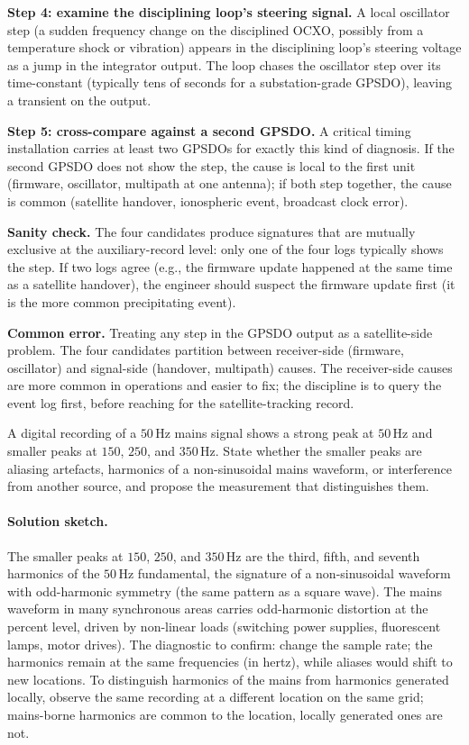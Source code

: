 \begin{exercise}
\textbf{Step 4: examine the disciplining loop's steering signal.}
A local oscillator step (a sudden frequency change on the
disciplined OCXO, possibly from a temperature shock or
vibration) appears in the disciplining loop's steering voltage
as a jump in the integrator output. The loop chases the
oscillator step over its time-constant (typically tens of
seconds for a substation-grade GPSDO), leaving a transient on
the output.

\textbf{Step 5: cross-compare against a second GPSDO.} A critical
timing installation carries at least two GPSDOs for exactly this
kind of diagnosis. If the second GPSDO does not show the step,
the cause is local to the first unit (firmware, oscillator,
multipath at one antenna); if both step together, the cause is
common (satellite handover, ionospheric event, broadcast clock
error).

\textbf{Sanity check.} The four candidates produce signatures
that are mutually exclusive at the auxiliary-record level: only
one of the four logs typically shows the step. If two logs
agree (e.g., the firmware update happened at the same time as a
satellite handover), the engineer should suspect the firmware
update first (it is the more common precipitating event).

\textbf{Common error.} Treating any step in the GPSDO output as
a satellite-side problem. The four candidates partition between
receiver-side (firmware, oscillator) and signal-side (handover,
multipath) causes. The receiver-side causes are more common in
operations and easier to fix; the discipline is to query the
event log first, before reaching for the satellite-tracking
record.
\end{exercise}

\begin{exercise}
A digital recording of a $50 \,\si{\hertz}$ mains signal shows a
strong peak at $50 \,\si{\hertz}$ and smaller peaks at $150$,
$250$, and $350 \,\si{\hertz}$. State whether the smaller peaks
are aliasing artefacts, harmonics of a non-sinusoidal mains
waveform, or interference from another source, and propose the
measurement that distinguishes them.

\paragraph{Solution sketch.}
The smaller peaks at $150$, $250$, and $350 \,\si{\hertz}$ are
the third, fifth, and seventh harmonics of the $50 \,\si{\hertz}$
fundamental, the signature of a non-sinusoidal waveform with
odd-harmonic symmetry (the same pattern as a square wave). The
mains waveform in many synchronous areas carries odd-harmonic
distortion at the percent level, driven by non-linear loads
(switching power supplies, fluorescent lamps, motor drives). The
diagnostic to confirm: change the sample rate; the harmonics
remain at the same frequencies (in hertz), while aliases would
shift to new locations. To distinguish harmonics of the mains
from harmonics generated locally, observe the same recording at
a different location on the same grid; mains-borne harmonics are
common to the location, locally generated ones are not.
\end{exercise}

